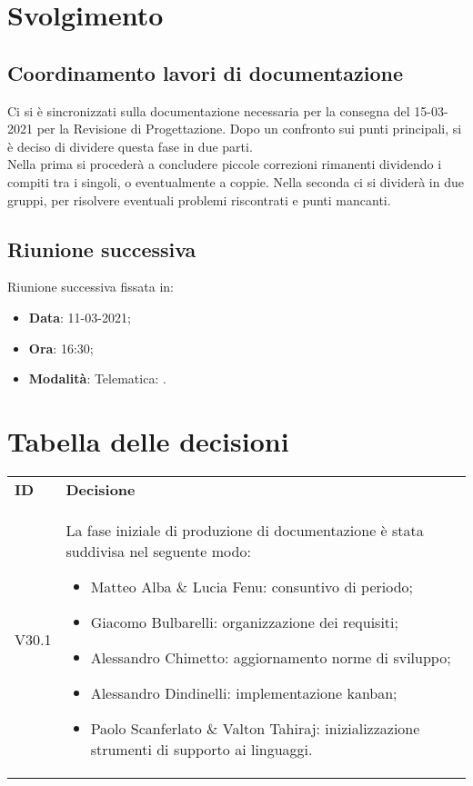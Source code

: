 \documentclass[]{article}
\begin{document}
	\newpage

	\section{Svolgimento}
		\subsection{Coordinamento lavori di documentazione}
		Ci si è sincronizzati sulla documentazione necessaria per la consegna del 15-03-2021 per la Revisione di Progettazione. Dopo un confronto sui punti principali, si è deciso di dividere questa fase in due parti.\\ 
		Nella prima si procederà a concludere piccole correzioni rimanenti dividendo i compiti tra i singoli, o eventualmente a coppie. Nella seconda ci si dividerà in due gruppi, per risolvere eventuali problemi riscontrati e punti mancanti.\\
			
		
	\subsection{Riunione successiva}
	Riunione successiva fissata in:
	\begin{itemize}
		\item \textbf{Data}: 11-03-2021;
		\item \textbf{Ora}: 16:30;
		\item \textbf{Modalità}: Telematica: .
	\end{itemize}
		
	\newpage
	
	\section{Tabella delle decisioni}
	
	\begin{table} [h!]
		\begin{center}
			\begin{tabular} { m{2cm} m{14cm} }
				\rowcolor{lightgray}
				\textbf{ID} & \textbf{Decisione}\\
				V30.1 & La fase iniziale di produzione di documentazione è stata suddivisa nel seguente modo:
				 \begin{itemize}
					\item Matteo Alba \& Lucia Fenu: consuntivo di periodo;
					\item Giacomo Bulbarelli: organizzazione dei requisiti;
					\item Alessandro Chimetto: aggiornamento norme di sviluppo;
					\item Alessandro Dindinelli: implementazione kanban;
					\item Paolo Scanferlato \& Valton Tahiraj: inizializzazione strumenti di supporto ai linguaggi.
				\end{itemize}\\
			\end{tabular}
		\end{center}
	\end{table}
	
\end{document}
